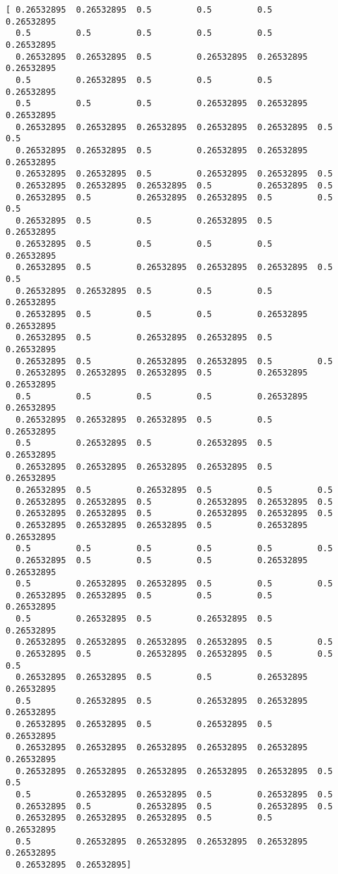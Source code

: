 \documentclass[12pt,fleqn]{article}\usepackage{../common}
\begin{document}
\begin{verbatim}
[ 0.26532895  0.26532895  0.5         0.5         0.5         0.26532895
  0.5         0.5         0.5         0.5         0.5         0.26532895
  0.26532895  0.26532895  0.5         0.26532895  0.26532895  0.26532895
  0.5         0.26532895  0.5         0.5         0.5         0.26532895
  0.5         0.5         0.5         0.26532895  0.26532895  0.26532895
  0.26532895  0.26532895  0.26532895  0.26532895  0.26532895  0.5         0.5
  0.26532895  0.26532895  0.5         0.26532895  0.26532895  0.26532895
  0.26532895  0.26532895  0.5         0.26532895  0.26532895  0.5
  0.26532895  0.26532895  0.26532895  0.5         0.26532895  0.5
  0.26532895  0.5         0.26532895  0.26532895  0.5         0.5         0.5
  0.26532895  0.5         0.5         0.26532895  0.5         0.26532895
  0.26532895  0.5         0.5         0.5         0.5         0.26532895
  0.26532895  0.5         0.26532895  0.26532895  0.26532895  0.5         0.5
  0.26532895  0.26532895  0.5         0.5         0.5         0.26532895
  0.26532895  0.5         0.5         0.5         0.26532895  0.26532895
  0.26532895  0.5         0.26532895  0.26532895  0.5         0.26532895
  0.26532895  0.5         0.26532895  0.26532895  0.5         0.5
  0.26532895  0.26532895  0.26532895  0.5         0.26532895  0.26532895
  0.5         0.5         0.5         0.5         0.26532895  0.26532895
  0.26532895  0.26532895  0.26532895  0.5         0.5         0.26532895
  0.5         0.26532895  0.5         0.26532895  0.5         0.26532895
  0.26532895  0.26532895  0.26532895  0.26532895  0.5         0.26532895
  0.26532895  0.5         0.26532895  0.5         0.5         0.5
  0.26532895  0.26532895  0.5         0.26532895  0.26532895  0.5
  0.26532895  0.26532895  0.5         0.26532895  0.26532895  0.5
  0.26532895  0.26532895  0.26532895  0.5         0.26532895  0.26532895
  0.5         0.5         0.5         0.5         0.5         0.5
  0.26532895  0.5         0.5         0.5         0.26532895  0.26532895
  0.5         0.26532895  0.26532895  0.5         0.5         0.5
  0.26532895  0.26532895  0.5         0.5         0.5         0.26532895
  0.5         0.26532895  0.5         0.26532895  0.5         0.26532895
  0.26532895  0.26532895  0.26532895  0.26532895  0.5         0.5
  0.26532895  0.5         0.26532895  0.26532895  0.5         0.5         0.5
  0.26532895  0.26532895  0.5         0.5         0.26532895  0.26532895
  0.5         0.26532895  0.5         0.26532895  0.26532895  0.26532895
  0.26532895  0.26532895  0.5         0.26532895  0.5         0.26532895
  0.26532895  0.26532895  0.26532895  0.26532895  0.26532895  0.26532895
  0.26532895  0.26532895  0.26532895  0.26532895  0.26532895  0.5         0.5
  0.5         0.26532895  0.26532895  0.5         0.26532895  0.5
  0.26532895  0.5         0.26532895  0.5         0.26532895  0.5
  0.26532895  0.26532895  0.26532895  0.5         0.5         0.26532895
  0.5         0.26532895  0.26532895  0.26532895  0.26532895  0.26532895
  0.26532895  0.26532895]
\end{verbatim}
\end{document}
